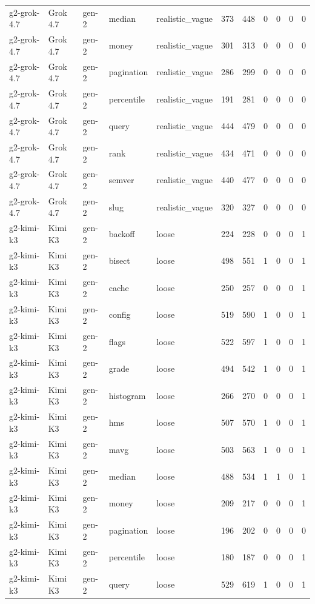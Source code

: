 \begin{tabular}{lllllllllll}
g2-grok-4.7 & Grok 4.7 & gen-2 & median & realistic\_vague & 373 & 448 & 0 & 0 & 0 & 0 \\
g2-grok-4.7 & Grok 4.7 & gen-2 & money & realistic\_vague & 301 & 313 & 0 & 0 & 0 & 0 \\
g2-grok-4.7 & Grok 4.7 & gen-2 & pagination & realistic\_vague & 286 & 299 & 0 & 0 & 0 & 0 \\
g2-grok-4.7 & Grok 4.7 & gen-2 & percentile & realistic\_vague & 191 & 281 & 0 & 0 & 0 & 0 \\
g2-grok-4.7 & Grok 4.7 & gen-2 & query & realistic\_vague & 444 & 479 & 0 & 0 & 0 & 0 \\
g2-grok-4.7 & Grok 4.7 & gen-2 & rank & realistic\_vague & 434 & 471 & 0 & 0 & 0 & 0 \\
g2-grok-4.7 & Grok 4.7 & gen-2 & semver & realistic\_vague & 440 & 477 & 0 & 0 & 0 & 0 \\
g2-grok-4.7 & Grok 4.7 & gen-2 & slug & realistic\_vague & 320 & 327 & 0 & 0 & 0 & 0 \\
g2-kimi-k3 & Kimi K3 & gen-2 & backoff & loose & 224 & 228 & 0 & 0 & 0 & 1 \\
g2-kimi-k3 & Kimi K3 & gen-2 & bisect & loose & 498 & 551 & 1 & 0 & 0 & 1 \\
g2-kimi-k3 & Kimi K3 & gen-2 & cache & loose & 250 & 257 & 0 & 0 & 0 & 1 \\
g2-kimi-k3 & Kimi K3 & gen-2 & config & loose & 519 & 590 & 1 & 0 & 0 & 1 \\
g2-kimi-k3 & Kimi K3 & gen-2 & flags & loose & 522 & 597 & 1 & 0 & 0 & 1 \\
g2-kimi-k3 & Kimi K3 & gen-2 & grade & loose & 494 & 542 & 1 & 0 & 0 & 1 \\
g2-kimi-k3 & Kimi K3 & gen-2 & histogram & loose & 266 & 270 & 0 & 0 & 0 & 1 \\
g2-kimi-k3 & Kimi K3 & gen-2 & hms & loose & 507 & 570 & 1 & 0 & 0 & 1 \\
g2-kimi-k3 & Kimi K3 & gen-2 & mavg & loose & 503 & 563 & 1 & 0 & 0 & 1 \\
g2-kimi-k3 & Kimi K3 & gen-2 & median & loose & 488 & 534 & 1 & 1 & 0 & 1 \\
g2-kimi-k3 & Kimi K3 & gen-2 & money & loose & 209 & 217 & 0 & 0 & 0 & 1 \\
g2-kimi-k3 & Kimi K3 & gen-2 & pagination & loose & 196 & 202 & 0 & 0 & 0 & 0 \\
g2-kimi-k3 & Kimi K3 & gen-2 & percentile & loose & 180 & 187 & 0 & 0 & 0 & 1 \\
g2-kimi-k3 & Kimi K3 & gen-2 & query & loose & 529 & 619 & 1 & 0 & 0 & 1 \\

\end{tabular}
